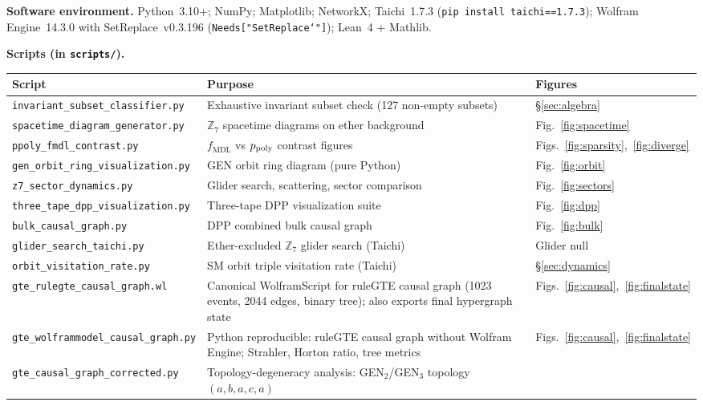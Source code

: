 \documentclass[11pt]{article}
\theoremstyle{remark}
\newcommand{\ZS}{\ensuremath{\mathbb{Z}_7}}
\newcommand{\fmdl}{\ensuremath{f_{\mathrm{MDL}}}}
\begin{document}
\begin{appendices}
\noindent\textbf{Software environment.}
Python~3.10+; NumPy; Matplotlib; NetworkX; Taichi~1.7.3
(\texttt{pip install taichi==1.7.3}); Wolfram Engine~14.3.0 with
SetReplace~v0.3.196 (\texttt{Needs["SetReplace`"]}); Lean~4 + Mathlib.

\noindent\textbf{Scripts (in \texttt{scripts/}).}

\begin{center}
\footnotesize
\begin{tabular}{@{}p{5.8cm}p{4.6cm}p{2.6cm}@{}}
\toprule
Script & Purpose & Figures \\
\midrule
\texttt{invariant\_subset\_classifier.py}
  & Exhaustive invariant subset check (127 non-empty subsets)
  & §\ref{sec:algebra} \\
\texttt{spacetime\_diagram\_generator.py}
  & $\ZS$ spacetime diagrams on ether background
  & Fig.~\ref{fig:spacetime} \\
\texttt{ppoly\_fmdl\_contrast.py}
  & $\fmdl{}$ vs $p_{\rm poly}$ contrast figures
  & Figs.~\ref{fig:sparsity},~\ref{fig:diverge} \\
\texttt{gen\_orbit\_ring\_visualization.py}
  & GEN orbit ring diagram (pure Python)
  & Fig.~\ref{fig:orbit} \\
\texttt{z7\_sector\_dynamics.py}
  & Glider search, scattering, sector comparison
  & Fig.~\ref{fig:sectors} \\
\texttt{three\_tape\_dpp\_visualization.py}
  & Three-tape DPP visualization suite
  & Fig.~\ref{fig:dpp} \\
\texttt{bulk\_causal\_graph.py}
  & DPP combined bulk causal graph
  & Fig.~\ref{fig:bulk} \\
\texttt{glider\_search\_taichi.py}
  & Ether-excluded $\ZS$ glider search (Taichi)
  & Glider null \\
\texttt{orbit\_visitation\_rate.py}
  & SM orbit triple visitation rate (Taichi)
  & §\ref{sec:dynamics} \\
\texttt{gte\_rulegte\_causal\_graph.wl}
  & Canonical WolframScript for ruleGTE causal graph (1023 events,
    2044 edges, binary tree); also exports final hypergraph state
  & Figs.~\ref{fig:causal},~\ref{fig:finalstate} \\
\texttt{gte\_wolframmodel\_causal\_graph.py}
  & Python reproducible: ruleGTE causal graph without Wolfram Engine;
    Strahler, Horton ratio, tree metrics
  & Figs.~\ref{fig:causal},~\ref{fig:finalstate} \\
\texttt{gte\_causal\_graph\_corrected.py}
  & Topology-degeneracy analysis: GEN$_2$/GEN$_3$ topology $(a,b,a,c,a)$

\end{tabular}
\end{center}
\end{appendices}
\end{document}

